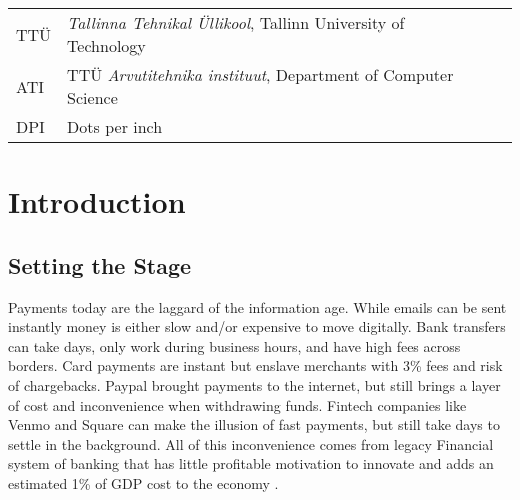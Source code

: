\documentclass[12pt]{article} %
\begin{document}
\begin{tabular}{p{3 cm}ll} %
TTÜ & \textit{Tallinna Tehnikal Üllikool}, Tallinn University of Technology\\
ATI & TTÜ \textit{Arvutitehnika instituut}, Department of Computer Science\\
DPI & Dots per inch
\end{tabular}


\pagebreak

\tableofcontents
\newpage

\listoffigures
\pagebreak

\listoftables
\pagebreak

\section{Introduction}
\label{Introduction}


\subsection{Setting the Stage}
Payments today are the laggard of the information age. While emails can be sent instantly money is either slow and/or expensive to move digitally. Bank transfers can take days, only work during business hours, and have high fees across borders. Card payments are instant but enslave merchants with 3\% fees and risk of chargebacks. Paypal brought payments to the internet, but still brings a layer of cost and inconvenience when withdrawing funds. Fintech companies like Venmo and Square can make the illusion of fast payments, but still take days to settle in the background. All of this inconvenience comes from legacy Financial system of banking that has little profitable motivation to innovate and adds an estimated 1\% of GDP cost to the economy .
\end{document}
